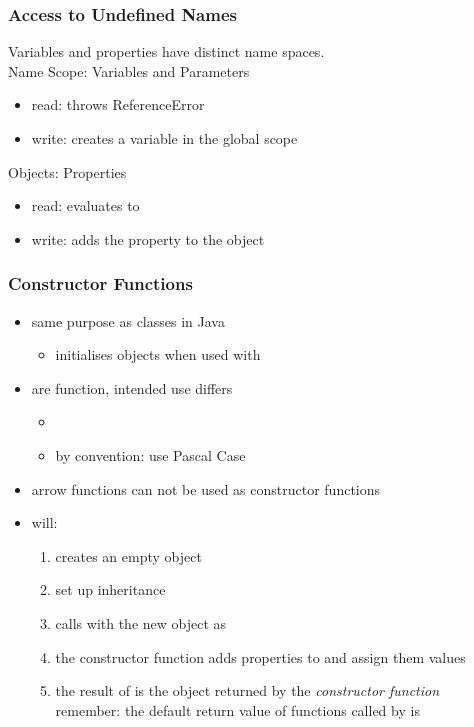 \begin{frame}[fragile] \frametitle{Access to Undefined Names}
Variables and properties have distinct name spaces.
\\ \vspace{4mm}
Name Scope: Variables and Parameters
\begin{itemize}
  \item read: throws ReferenceError
  \item write: creates a variable in the global scope
\end{itemize}
\vspace{5mm}
Objects: Properties
\begin{itemize}
  \item read: evaluates to 
  \item write: adds the property to the object
\end{itemize}
\end{frame}

\begin{frame}[fragile] \frametitle{Constructor Functions}

\begin{itemize}
  \item same purpose as classes in Java
  \begin{itemize}
    \item initialises objects when used with 
  \end{itemize}
  \item are	 function, intended use differs
  \begin{itemize}
    \item {}
    \item by convention: use Pascal Case
  \end{itemize}
  \item arrow functions can not be used as constructor functions
  \item {} will:
  \begin{enumerate}
    \item creates an empty object
    \item set up inheritance
    \item calls  with the new object as 
    \item the constructor function adds properties to  and assign them values
    \item the result of  is the object returned by the \emph{constructor function}\\
             remember: the default return value of functions called by  is 
  \end{enumerate}
\end{itemize}
\end{frame}

